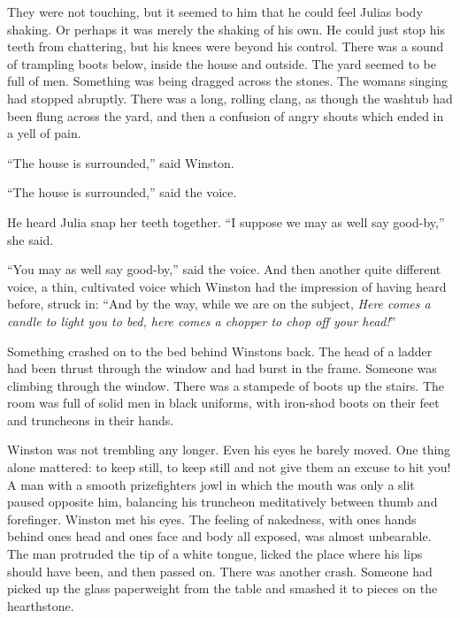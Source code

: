 They were not touching, but it seemed to him that he could feel
Julia\textquotesingle s body shaking. Or perhaps it was merely the
shaking of his own. He could just stop his teeth from chattering, but
his knees were beyond his control. There was a sound of trampling boots
below, inside the house and outside. The yard seemed to be full of men.
Something was being dragged across the stones. The
woman\textquotesingle s singing had stopped abruptly. There was a long,
rolling clang, as though the washtub had been flung across the yard, and
then a confusion of angry shouts which ended in a yell of pain.

``The house is surrounded,'' said Winston.

``The house is surrounded,'' said the voice.

He heard Julia snap her teeth together. ``I suppose we may as well say
good-by,'' she said.

``You may as well say good-by,'' said the voice. And then another quite
different voice, a thin, cultivated voice which Winston had the
impression of having heard before, struck in: ``And by the way, while we
are on the subject, \emph{Here comes a candle to light you to bed, here
comes a chopper to chop off your head!}''

Something crashed on to the bed behind Winston\textquotesingle s back.
The head of a ladder had been thrust through the window and had burst in
the frame. Someone was climbing through the window. There was a stampede
of boots up the stairs. The room was full of solid men in black
uniforms, with iron-shod boots on their feet and truncheons in their
hands.

Winston was not trembling any longer. Even his eyes he barely moved. One
thing alone mattered: to keep still, to keep still and not give them an
excuse to hit you! A man with a smooth prizefighter\textquotesingle s
jowl in which the mouth was only a slit paused opposite him, balancing
his truncheon meditatively between thumb and forefinger. Winston met his
eyes. The feeling of nakedness, with one\textquotesingle s hands behind
one\textquotesingle s head and one\textquotesingle s face and body all
exposed, was almost unbearable. The man protruded the tip of a white
tongue, licked the place where his lips should have been, and then
passed on. There was another crash. Someone had picked up the glass
paperweight from the table and smashed it to pieces on the hearthstone.


